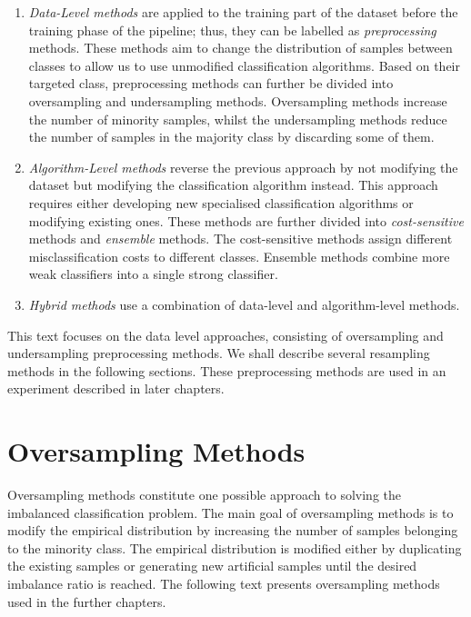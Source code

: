 \begin{enumerate}
    \item \emph{Data-Level methods} are applied to the training part of the dataset before the
        training phase of the pipeline; thus, they can be labelled as \emph{preprocessing} methods.
        These methods aim to change the distribution of samples between classes to allow us to use
        unmodified classification algorithms. Based on their targeted class, preprocessing methods
        can further be divided into oversampling and undersampling methods. Oversampling methods
        increase the number of minority samples, whilst the undersampling methods reduce the number
        of samples in the majority class by discarding some of them.

    \item \emph{Algorithm-Level methods} reverse the previous approach by not modifying the dataset
        but modifying the classification algorithm instead. This approach requires either
        developing new specialised classification algorithms or modifying existing ones. These
        methods are further divided into \emph{cost-sensitive} methods and \emph{ensemble} methods.
        The cost-sensitive methods assign different misclassification costs to different classes.
        Ensemble methods combine more weak classifiers into a single strong classifier.

    \item \emph{Hybrid methods} use a combination of data-level and algorithm-level methods.
\end{enumerate}

This text focuses on the data level approaches, consisting of oversampling and undersampling
preprocessing methods. We shall describe several resampling methods in the following sections.
These preprocessing methods are used in an experiment described in later chapters.


\section{Oversampling Methods}
\label{section:oversampling-methods}

Oversampling methods constitute one possible approach to solving the imbalanced classification
problem. The main goal of oversampling methods is to modify the empirical distribution by
increasing the number of samples belonging to the minority class. The empirical distribution is
modified either by duplicating the existing samples or generating new artificial samples until the
desired imbalance ratio is reached. The following text presents oversampling methods used in the
further chapters.


